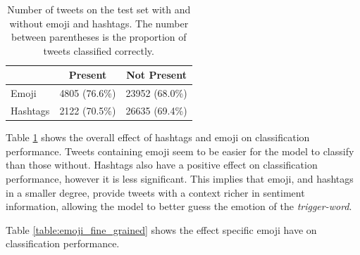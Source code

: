 \documentclass[11pt,a4paper]{article}
\begin{document}
\begin{table}[!h]
    \centering
    \footnotesize

    \begin{tabular}{lcc}

        \textbf{} & \textbf{Present} & \textbf{Not Present} \\
        \hline
        \hline
        Emoji     & 4805 (76.6\%)    & 23952 (68.0\%)       \\
        Hashtags  & 2122 (70.5\%)    & 26635 (69.4\%)       \\

    \end{tabular}

    \caption{Number of tweets on the test set with and without emoji and
    hashtags. The number between parentheses is the proportion of tweets
    classified correctly.}

    \label{table:emoji_and_hashtags}

\end{table}

Table \ref{table:emoji_and_hashtags} shows the overall effect of hashtags and
emoji on classification performance. Tweets containing emoji seem to be easier
for the model to classify than those without. Hashtags also have a positive
effect on classification performance, however it is less significant. This implies that emoji, and hashtags in a smaller degree, provide
tweets with a context richer in sentiment information, allowing the model to
better guess the emotion of the \textit{trigger-word}.

Table \ref{table:emoji_fine_grained} shows the effect specific emoji have on classification performance. 
\end{document}
